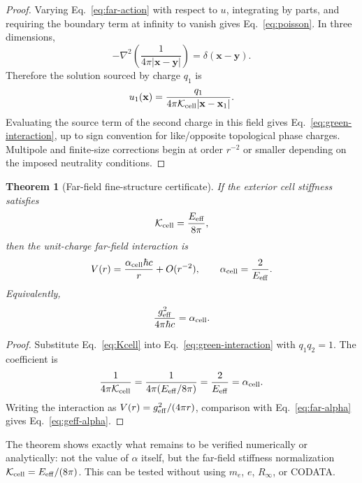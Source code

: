 \documentclass[11pt]{article}
\newcommand{\Eeff}{E_{\rm eff}}
\newcommand{\alphacell}{\alpha_{\rm cell}}
\newcommand{\Kcell}{\mathcal K_{\rm cell}}
\newtheorem{theorem}{Theorem}
\begin{document}
\begin{proof}
Varying Eq.~\eqref{eq:far-action} with respect to \(u\), integrating by parts, and requiring the boundary term at infinity to vanish gives Eq.~\eqref{eq:poisson}. In three dimensions,
\begin{equation}
-\nabla^2\left(\frac{1}{4\pi |\mathbf x-\mathbf y|}\right)=\delta(\mathbf x-\mathbf y).
\end{equation}
Therefore the solution sourced by charge \(q_1\) is
\begin{equation}
u_1(\mathbf x)=\frac{q_1}{4\pi\Kcell |\mathbf x-\mathbf x_1|}.
\end{equation}
Evaluating the source term of the second charge in this field gives Eq.~\eqref{eq:green-interaction}, up to sign convention for like/opposite topological phase charges. Multipole and finite-size corrections begin at order \(r^{-2}\) or smaller depending on the imposed neutrality conditions.
\end{proof}

\begin{theorem}[Far-field fine-structure certificate]
\label{thm:farfield}
If the exterior cell stiffness satisfies
\begin{equation}
\Kcell=\frac{\Eeff}{8\pi},
\label{eq:Kcell}
\end{equation}
then the unit-charge far-field interaction is
\begin{equation}
V(r)=\frac{\alphacell\hbar c}{r}+O(r^{-2}),
\qquad
\alphacell=\frac{2}{\Eeff}.
\label{eq:far-alpha}
\end{equation}
Equivalently,
\begin{equation}
\frac{g_{\rm eff}^2}{4\pi\hbar c}=\alphacell.
\label{eq:geff-alpha}
\end{equation}
\end{theorem}

\begin{proof}
Substitute Eq.~\eqref{eq:Kcell} into Eq.~\eqref{eq:green-interaction} with \(q_1q_2=1\). The coefficient is
\begin{equation}
\frac{1}{4\pi\Kcell}
=
\frac{1}{4\pi(\Eeff/8\pi)}
=
\frac{2}{\Eeff}
=\alphacell.
\end{equation}
Writing the interaction as \(V(r)=g_{\rm eff}^2/(4\pi r)\), comparison with Eq.~\eqref{eq:far-alpha} gives Eq.~\eqref{eq:geff-alpha}.
\end{proof}

The theorem shows exactly what remains to be verified numerically or analytically: not the value of \(\alpha\) itself, but the far-field stiffness normalization \(\Kcell=\Eeff/(8\pi)\). This can be tested without using \(m_e\), \(e\), \(R_\infty\), or CODATA.
\end{document}
